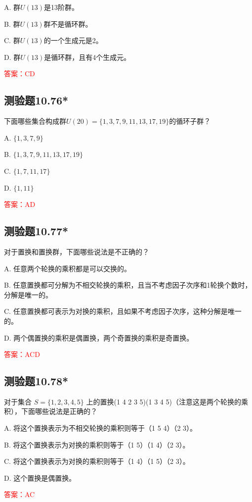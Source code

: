 \documentclass[UTF8, heading=true]{ctexart}
\begin{document}
A. 群$U(13)$是13阶群。

B. 群$U(13)$群不是循环群。

C. 群$U(13)$的一个生成元是2。

D. 群$U(13)$是循环群，且有4个生成元。

\textcolor{red}{答案：CD}

\subsection{测验题10.76*}

下面哪些集合构成群$U(20)=\{1,3,7,9,11,13,17,19\}$的循环子群？

A. $\{1,3,7,9\}$

B. $\{1,3,7,9,11,13,17,19\}$

C. $\{1,7,11,17\}$

D. $\{1,11\}$

\textcolor{red}{答案：AD}

\subsection{测验题10.77*}

对于置换和置换群，下面哪些说法是不正确的？

A. 任意两个轮换的乘积都是可以交换的。

B. 任意置换都可分解为不相交轮换的乘积，且当不考虑因子次序和1轮换个数时，分解是唯一的。

C. 任意置换都可表示为对换的乘积，且如果不考虑因子次序，这种分解是唯一的。

D. 两个偶置换的乘积是偶置换，两个奇置换的乘积是奇置换。

\textcolor{red}{答案：ACD}

\subsection{测验题10.78*}

对于集合 $S=\{1,2,3,4,5\}$ 上的置换(1 4 2 3 5)(1 3 4 5)（注意这是两个轮换的乘积），下面哪些说法是正确的？

A. 将这个置换表示为不相交轮换的乘积则等于（1 5 4）（2 3）。

B. 将这个置换表示为对换的乘积则等于（1 5）（1 4）（2 3）。

C. 将这个置换表示为对换的乘积则等于（1 4）（1 5）（2 3）。

D. 这个置换是偶置换。

\textcolor{red}{答案：AC}
\end{document}

